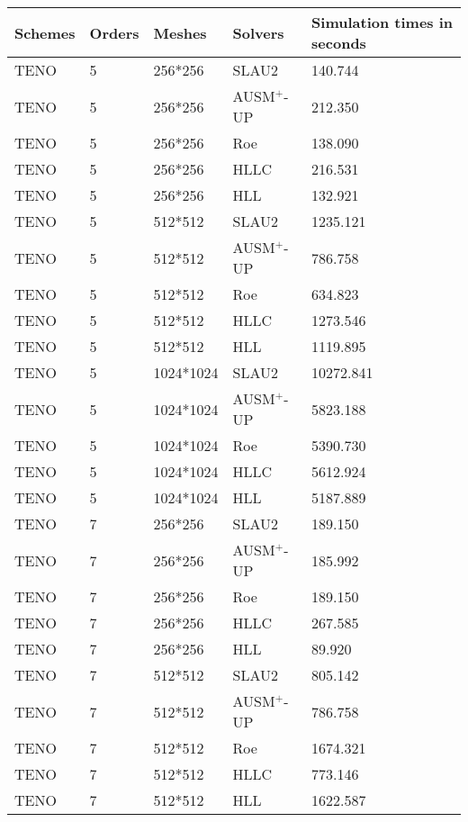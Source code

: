 \begin{table}[!ht]
    \centering
    \begin{tabular}{|l|l|l|l|l|}
    \hline
        Schemes & Orders & Meshes & Solvers & Simulation times in seconds \\ \hline
        TENO & 5 & 256*256 & SLAU2 & 140.744 \\ \hline
        TENO & 5 & 256*256 & AUSM$^+$-UP & 212.350 \\ \hline
        TENO & 5 & 256*256 & Roe & 138.090 \\ \hline
        TENO & 5 & 256*256 & HLLC & 216.531 \\ \hline
        TENO & 5 & 256*256 & HLL & 132.921 \\ \hline
        TENO & 5 & 512*512 & SLAU2 & 1235.121 \\ \hline
        TENO & 5 & 512*512 & AUSM$^+$-UP & 786.758 \\ \hline
        TENO & 5 & 512*512 & Roe & 634.823 \\ \hline
        TENO & 5 & 512*512 & HLLC & 1273.546 \\ \hline
        TENO & 5 & 512*512 & HLL & 1119.895 \\ \hline
        TENO & 5 & 1024*1024 & SLAU2 & 10272.841 \\ \hline
        TENO & 5 & 1024*1024 & AUSM$^+$-UP & 5823.188 \\ \hline
        TENO & 5 & 1024*1024 & Roe & 5390.730 \\ \hline
        TENO & 5 & 1024*1024 & HLLC & 5612.924 \\ \hline
        TENO & 5 & 1024*1024 & HLL & 5187.889 \\ \hline
        TENO & 7 & 256*256 & SLAU2 & 189.150 \\ \hline
        TENO & 7 & 256*256 & AUSM$^+$-UP & 185.992 \\ \hline
        TENO & 7 & 256*256 & Roe & 189.150 \\ \hline
        TENO & 7 & 256*256 & HLLC & 267.585 \\ \hline
        TENO & 7 & 256*256 & HLL & 89.920 \\ \hline
        TENO & 7 & 512*512 & SLAU2 & 805.142 \\ \hline
        TENO & 7 & 512*512 & AUSM$^+$-UP & 786.758 \\ \hline
        TENO & 7 & 512*512 & Roe & 1674.321 \\ \hline
        TENO & 7 & 512*512 & HLLC & 773.146 \\ \hline
        TENO & 7 & 512*512 & HLL & 1622.587 \\ \hline

\end{tabular}
\end{table}
